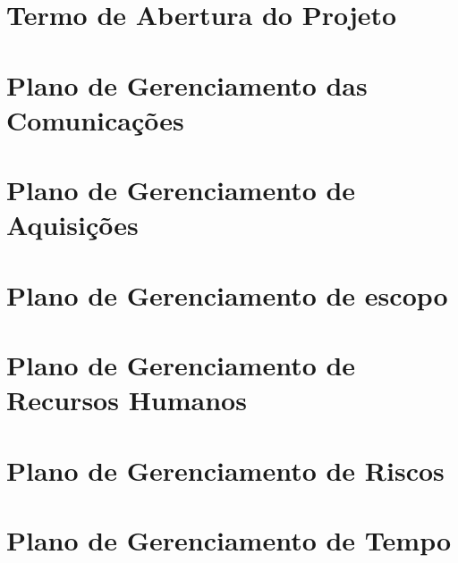 \begin{anexosenv}

\partanexos

\chapter{Termo de Abertura do Projeto}

  

\chapter{Plano de Gerenciamento das Comunicações}

  

\chapter{Plano de Gerenciamento de Aquisições}

  

\chapter{Plano de Gerenciamento de escopo}

 

\chapter{Plano de Gerenciamento de Recursos Humanos}

  
  
\chapter{Plano de Gerenciamento de Riscos}

  

\chapter{Plano de Gerenciamento de Tempo}

  
  
\end{anexosenv}

